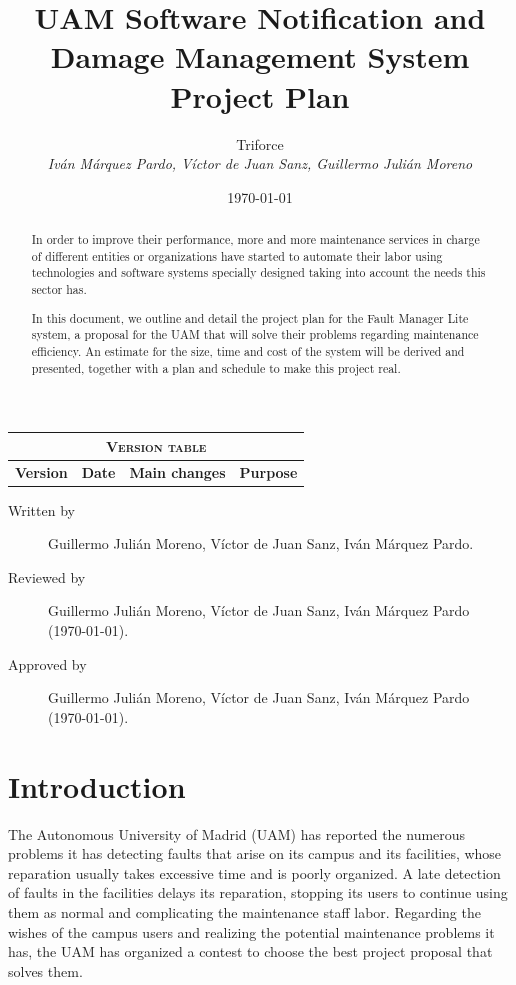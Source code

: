 \documentclass[11pt]{report}
\title{UAM Software Notification and Damage Management System \\ Project Plan}
\date{\today}
\author{{\Large Triforce} \\ \vspace{5pt} \textit{Iván Márquez Pardo, Víctor de Juan Sanz, Guillermo Julián Moreno}}
\begin{document}
\maketitle

\begin{table}[hbtp]
\centering
\begin{tabular}{|c|c|p{3cm}|p{3.5cm}|}
\hline \multicolumn{4}{|c|}{\textsc{Version table}} \\ \hline \hline
\textbf{Version} & \textbf{Date} & \textbf{Main changes} & \textbf{Purpose} \\ \hline
\end{tabular}
\end{table}

\begin{description}
\item[Written by] Guillermo Julián Moreno, Víctor de Juan Sanz, Iván Márquez Pardo.
\item[Reviewed by] Guillermo Julián Moreno, Víctor de Juan Sanz, Iván Márquez Pardo (\today).
\item[Approved by] Guillermo Julián Moreno, Víctor de Juan Sanz, Iván Márquez Pardo (\today).
\end{description}

\newpage

\begin{abstract}
In order to improve their performance, more and more maintenance services in charge of different entities or organizations have started to automate their labor using technologies and software systems specially designed taking into account the needs this sector has.

In this document, we outline and detail the project plan for the Fault Manager Lite system, a proposal for the UAM that will solve their problems regarding maintenance efficiency. An estimate for the size, time and cost of the system will be derived and presented, together with a plan and schedule to make this project real.
\end{abstract}

\tableofcontents
\newpage
\listoftables
\newpage

\pagestyle{plain}

\chapter{Introduction}
\label{chapIntroduction}

The Autonomous University of Madrid (UAM) has reported the numerous problems it has detecting faults that arise on its campus and its facilities, whose reparation usually takes excessive time and is poorly organized. A late detection of faults in the facilities delays its reparation, stopping its users to continue using them as normal and complicating the maintenance staff labor. Regarding the wishes of the campus users and realizing the potential maintenance problems it has, the UAM has organized a contest to choose the best project proposal that solves them.
\end{document}
